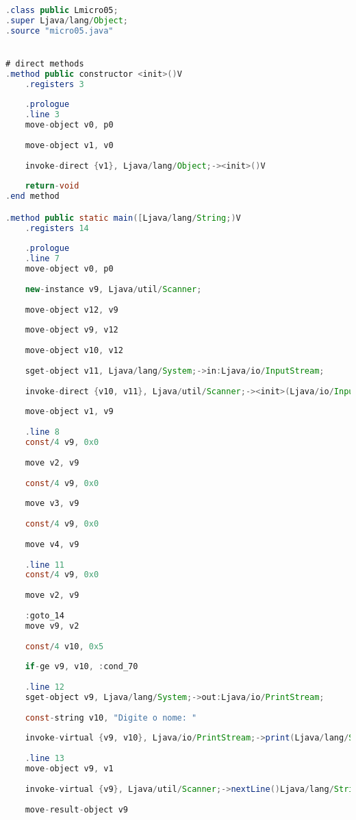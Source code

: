 \documentclass[hidelinks,12pt]{article}
\begin{document}
	\begin{lstlisting}[caption=Smali resultante do .java,language=java]
.class public Lmicro05;
.super Ljava/lang/Object;
.source "micro05.java"


# direct methods
.method public constructor <init>()V
	.registers 3
	
	.prologue
	.line 3
	move-object v0, p0
	
	move-object v1, v0
	
	invoke-direct {v1}, Ljava/lang/Object;-><init>()V
	
	return-void
.end method

.method public static main([Ljava/lang/String;)V
	.registers 14
	
	.prologue
	.line 7
	move-object v0, p0
	
	new-instance v9, Ljava/util/Scanner;
	
	move-object v12, v9
	
	move-object v9, v12
	
	move-object v10, v12
	
	sget-object v11, Ljava/lang/System;->in:Ljava/io/InputStream;
	
	invoke-direct {v10, v11}, Ljava/util/Scanner;-><init>(Ljava/io/InputStream;)V
	
	move-object v1, v9
	
	.line 8
	const/4 v9, 0x0
	
	move v2, v9
	
	const/4 v9, 0x0
	
	move v3, v9
	
	const/4 v9, 0x0
	
	move v4, v9
	
	.line 11
	const/4 v9, 0x0
	
	move v2, v9
	
	:goto_14
	move v9, v2
	
	const/4 v10, 0x5
	
	if-ge v9, v10, :cond_70
	
	.line 12
	sget-object v9, Ljava/lang/System;->out:Ljava/io/PrintStream;
	
	const-string v10, "Digite o nome: "
	
	invoke-virtual {v9, v10}, Ljava/io/PrintStream;->print(Ljava/lang/String;)V
	
	.line 13
	move-object v9, v1
	
	invoke-virtual {v9}, Ljava/util/Scanner;->nextLine()Ljava/lang/String;
	
	move-result-object v9
	

\end{lstlisting}
\end{document}
